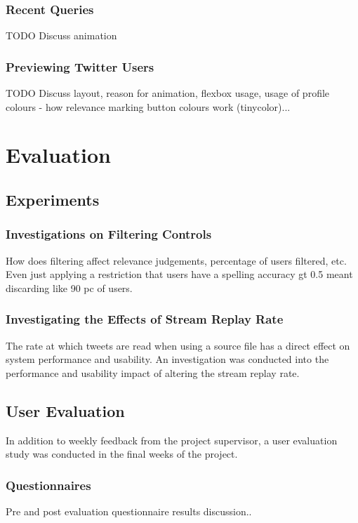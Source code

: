 \documentclass{l4proj}
\begin{document}
        \subsection{Recent Queries}
        TODO Discuss animation
        
        \subsection{Previewing Twitter Users}
        TODO Discuss layout, reason for animation, flexbox usage, usage of profile colours - how relevance marking button colours work (tinycolor)... 
        
        
\chapter{Evaluation}

\section{Experiments}
    
    \subsection{Investigations on Filtering Controls}
    How does filtering affect relevance judgements, percentage of users filtered, etc. Even just applying a restriction that users have a spelling accuracy gt 0.5 meant discarding like 90 pc of users.
    
    \subsection{Investigating the Effects of Stream Replay Rate}
    The rate at which tweets are read when using a source file has a direct effect on system performance and usability. An investigation was conducted into the performance and usability impact of altering the stream replay rate.

\section{User Evaluation}

    In addition to weekly feedback from the project supervisor, a user evaluation study was conducted in the final weeks of the project.

    \subsection{Questionnaires}
    Pre and post evaluation questionnaire results discussion..
\end{document}
